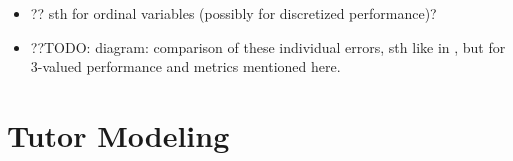 \begin{itemize}
\begin{itemize}
\item ?? sth for ordinal variables (possibly for discretized performance)?
\item ??TODO: diagram: comparison of these individual errors, sth like in
  \cite[p.6]{pelanek-evaluation-student-models}, but for 3-valued performance and
  metrics mentioned here.
\end{itemize}
\end{itemize}

\section{Tutor Modeling}
\label{sec:tutor-modeling}

